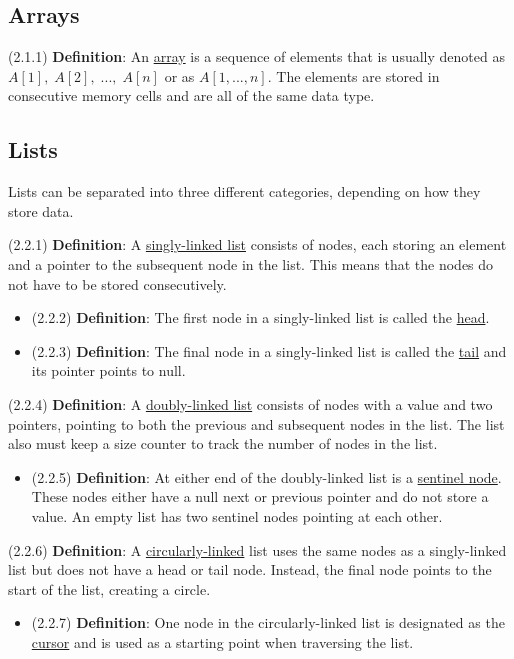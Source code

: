 \documentclass{article}
\newcommand{\separate}[1] {\vspace{#1 pt}\noindent}
\newcommand{\definition}[2]{(#1) \textbf{Definition}: #2}
\begin{document}
\subsection{Arrays}

\definition{2.1.1}{An \underline{array} is a sequence of elements that is usually denoted as \(A[1], \; A[2], \; ..., \; A[n]\) or as \(A[1,...,n]\).} The elements are stored in consecutive memory cells and are all of the same data type. 

\subsection{Lists}

Lists can be separated into three different categories, depending on how they store data. 

\separate{5}\definition{2.2.1}{A \underline{singly-linked list} consists of nodes, each storing an element and a pointer to the subsequent node in the list. This means that the nodes do not have to be stored consecutively.}
\begin{itemize}
    \item \definition{2.2.2}{The first node in a singly-linked list is called the \underline{head}.}
    \item \definition{2.2.3}{The final node in a singly-linked list is called the \underline{tail} and its pointer points to null.}
\end{itemize}
\definition{2.2.4}{A \underline{doubly-linked list} consists of nodes with a value and two pointers, pointing to both the previous and subsequent nodes in the list. The list also must keep a size counter to track the number of nodes in the list.}
\begin{itemize}
    \item \definition{2.2.5}{At either end of the doubly-linked list is a \underline{sentinel node}. These nodes either have a null next or previous pointer and do not store a value. An empty list has two sentinel nodes pointing at each other.}
\end{itemize}
\definition{2.2.6}{A \underline{circularly-linked} list uses the same nodes as a singly-linked list but does not have a head or tail node. Instead, the final node points to the start of the list, creating a circle.}
\begin{itemize}
    \item \definition{2.2.7}{One node in the circularly-linked list is designated as the \underline{cursor} and is used as a starting point when traversing the list.}
\end{itemize}
\end{document}
